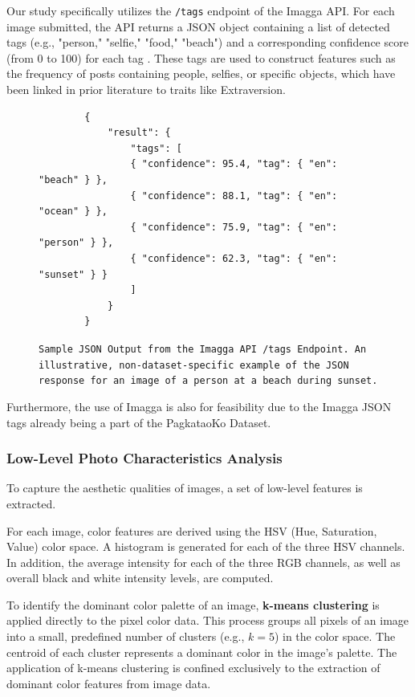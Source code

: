 Our study specifically utilizes the \texttt{/tags} endpoint of the Imagga API. For each image submitted, the API returns a JSON object containing a list of detected tags (e.g., "person," "selfie," "food," "beach") and a corresponding confidence score (from 0 to 100) for each tag \citep{imagga_docs}. These tags are used to construct features such as the frequency of posts containing people, selfies, or specific objects, which have been linked in prior literature to traits like Extraversion.

\begin{figure}[H]
	\centering
	\begin{verbatim}
		{
			"result": {
				"tags": [
				{ "confidence": 95.4, "tag": { "en": "beach" } },
				{ "confidence": 88.1, "tag": { "en": "ocean" } },
				{ "confidence": 75.9, "tag": { "en": "person" } },
				{ "confidence": 62.3, "tag": { "en": "sunset" } }
				]
			}
		}
	\end{verbatim}
	\caption{ \texttt{Sample JSON Output from the Imagga API /tags Endpoint. An illustrative, non-dataset-specific example of the JSON response for an image of a person at a beach during sunset.}}
	\label{fig:imagga_json}
\end{figure}

Furthermore, the use of Imagga is also for feasibility due to the Imagga JSON tags already being a part of the PagkataoKo Dataset.
\subsubsection{Low-Level Photo Characteristics Analysis}
To capture the aesthetic qualities of images, a set of low-level features is extracted.

For each image, color features are derived using the HSV (Hue, Saturation, Value) color space. A histogram is generated for each of the three HSV channels. In addition, the average intensity for each of the three RGB channels, as well as overall black and white intensity levels, are computed.

To identify the dominant color palette of an image, \textbf{k-means clustering} is applied directly to the pixel color data. This process groups all pixels of an image into a small, predefined number of clusters (e.g., $k=5$) in the color space. The centroid of each cluster represents a dominant color in the image's palette. The application of k-means clustering is confined exclusively to the extraction of dominant color features from image data.

